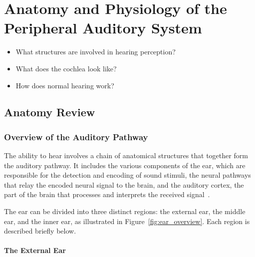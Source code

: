 	\pagestyle{fancy}
	\chead{}
	\rhead{{\sffamily \MakeUppercase\rightmark}}
	\lfoot{}
	\cfoot{{\sffamily \thepage}}
	\rfoot{}
	
\chapter{Anatomy and Physiology of the Peripheral Auditory System}

\begin{center}
	\begin{tcolorbox}[title=\boxtitle]
		\begin{itemize}[leftmargin=*,labelindent=2ex,labelsep=1.5ex,itemsep=0pt,parsep=0pt]
		    \item What structures are involved in hearing perception?
    		\item What does the cochlea look like?
			\item How does normal hearing work?
		\end{itemize}
	\end{tcolorbox}
\end{center}


\section{Anatomy Review}
\label{sect:anatomy_review}

\subsection{Overview of the Auditory Pathway}

The ability to hear involves a chain of anatomical structures that together form
the auditory pathway. It includes the various components of the ear, which are
responsible for the detection and encoding of sound stimuli, the neural pathways
that relay the encoded neural signal to the brain, and the auditory cortex, the
part of the brain that processes and interprets the received
signal~\cite{goldstein2009}.

The ear can be divided into three distinct regions: the external ear, the middle
ear, and the inner ear, as illustrated in Figure~\ref{fig:ear_overview}. Each
region is described briefly below.

\subsubsection{The External Ear}

